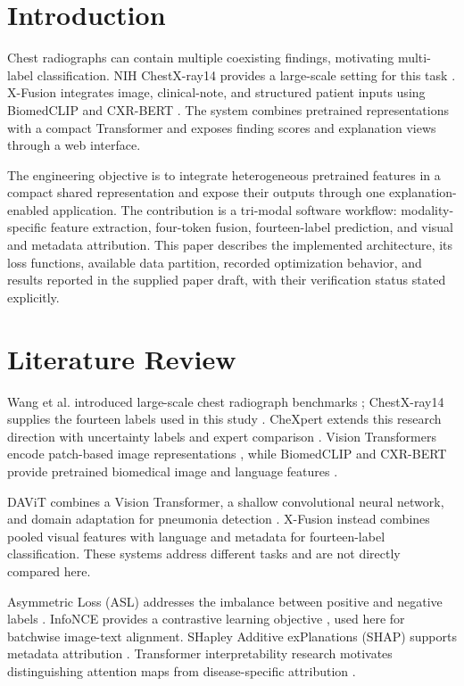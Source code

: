 \documentclass[conference,letterpaper]{IEEEtran}
\begin{document}
\section{Introduction}

Chest radiographs can contain multiple coexisting findings, motivating multi-label classification. NIH ChestX-ray14 provides a large-scale setting for this task \cite{wang2017,nihdataset}. X-Fusion integrates image, clinical-note, and structured patient inputs using BiomedCLIP \cite{biomedclip2023} and CXR-BERT \cite{cxrbert2022}. The system combines pretrained representations with a compact Transformer and exposes finding scores and explanation views through a web interface.

The engineering objective is to integrate heterogeneous pretrained features in a compact shared representation and expose their outputs through one explanation-enabled application. The contribution is a tri-modal software workflow: modality-specific feature extraction, four-token fusion, fourteen-label prediction, and visual and metadata attribution. This paper describes the implemented architecture, its loss functions, available data partition, recorded optimization behavior, and results reported in the supplied paper draft, with their verification status stated explicitly.

\section{Literature Review}

Wang et al. introduced large-scale chest radiograph benchmarks \cite{wang2017}; ChestX-ray14 supplies the fourteen labels used in this study \cite{nihdataset}. CheXpert extends this research direction with uncertainty labels and expert comparison \cite{irvin2019}. Vision Transformers encode patch-based image representations \cite{dosovitskiy2021}, while BiomedCLIP and CXR-BERT provide pretrained biomedical image and language features \cite{biomedclip2023,cxrbert2022}.

DAViT combines a Vision Transformer, a shallow convolutional neural network, and domain adaptation for pneumonia detection \cite{davit2025}. X-Fusion instead combines pooled visual features with language and metadata for fourteen-label classification. These systems address different tasks and are not directly compared here.

Asymmetric Loss (ASL) addresses the imbalance between positive and negative labels \cite{ridnik2021}. InfoNCE provides a contrastive learning objective \cite{oord2018}, used here for batchwise image-text alignment. SHapley Additive exPlanations (SHAP) supports metadata attribution \cite{lundberg2017}. Transformer interpretability research motivates distinguishing attention maps from disease-specific attribution \cite{chefer2021}.
\end{document}
